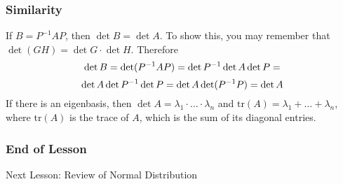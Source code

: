 \documentclass[xcolor=dvipsnames]{beamer}
\begin{document}
\begin{frame}
  \frametitle{Similarity}
  If $B=P^{-1}AP$, then $\det{}B=\det{}A$. To show this, you may
  remember that $\det{}(GH)=\det{}G\cdot\det{}H$. Therefore
  \begin{equation}
    \label{eq:taichahh}
    \det{}B=\det(P^{-1}AP)=\det{}P^{-1}\det{}A\det{}P=\notag
  \end{equation}
  \begin{equation}
    \label{eq:ielaemiy}
    \det{}A\det{}P^{-1}\det{}P=\det{}A\det(P^{-1}P)=\det{}A\notag
  \end{equation}
  If there is an eigenbasis, then
  $\det{}A=\lambda_{1}\cdot\ldots\cdot\lambda_{n}$ and
  $\mbox{tr}(A)=\lambda_{1}+\ldots+\lambda_{n}$, where $\mbox{tr}(A)$ is
  the \alert{trace} of $A$, which is the sum of its diagonal entries.
\end{frame}

\begin{frame}
  \frametitle{End of Lesson}
Next Lesson: Review of Normal Distribution
\end{frame}
\end{document}
